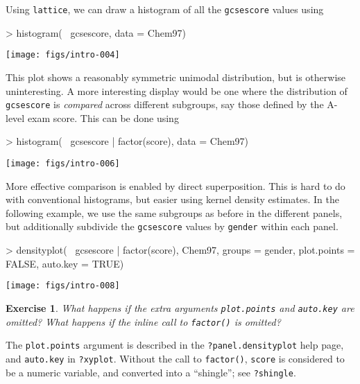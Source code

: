 \documentclass[10pt]{article}
\newcommand{\code}[1]{\texttt{#1}}
\newcommand{\lattice}{\code{lattice}}
\newcommand{\Rfunction}[1]{\code{#1()}}
\newtheorem{exercise}{Exercise}
\newenvironment{solution}{}{}
\begin{document}
\newpage

Using \lattice, we can draw a histogram of all the \code{gcsescore}
values using
\begin{Schunk}
\begin{Sinput}
> histogram(~ gcsescore, data = Chem97)
\end{Sinput}
\end{Schunk}
%
\begin{center}
\texttt{[image: figs/intro-004]}
\end{center}
This plot shows a reasonably symmetric unimodal distribution, but is
otherwise uninteresting.  A more interesting display would be one
where the distribution of \code{gcsescore} is \emph{compared} across
different subgroups, say those defined by the A-level exam score.
This can be done using
\begin{Schunk}
\begin{Sinput}
> histogram(~ gcsescore | factor(score), data = Chem97)
\end{Sinput}
\end{Schunk}
%
\begin{center}
\texttt{[image: figs/intro-006]}
\end{center}


\newpage

More effective comparison is enabled by direct superposition.  This is
hard to do with conventional histograms, but easier using kernel
density estimates.  In the following example, we use the same
subgroups as before in the different panels, but additionally
subdivide the \code{gcsescore} values by \code{gender} within each
panel.
\begin{Schunk}
\begin{Sinput}
> densityplot(~ gcsescore | factor(score), Chem97, groups = gender,
              plot.points = FALSE, auto.key = TRUE)
\end{Sinput}
\end{Schunk}
%
\begin{center}
\texttt{[image: figs/intro-008]}
\end{center}

\begin{exercise}
  What happens if the extra arguments \code{plot.points} and
  \code{auto.key} are omitted?  What happens if the inline call to
  \Rfunction{factor} is omitted?
\end{exercise}

\begin{solution}
  The \code{plot.points} argument is described in the
  \code{?panel.densityplot} help page, and \code{auto.key} in
  \code{?xyplot}.  Without the call to \Rfunction{factor},
  \code{score} is considered to be a numeric variable, and converted
  into a ``shingle''; see \code{?shingle}.
\end{solution}
\end{document}
